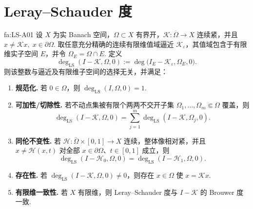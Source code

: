\section{Leray--Schauder 度}\label{sec:iii04-ls-degree}

\begin{FATheorem}{fa:LS-A01}
设 \(\displaystyle X\) 为实 Banach 空间，\(\displaystyle\Omega\subset X\) 有界开，\(\displaystyle\mathcal K:\overline\Omega\to X\) 连续紧，并且
\(\displaystyle x\neq\mathcal Kx, \; x\in\partial\Omega.\)
取任意充分精确的连续有限维值域逼近 \(\displaystyle\mathcal K_{\varepsilon}\)，其值域包含于有限维实子空间 \(\displaystyle E\)，并令 \(\displaystyle\Omega_E=\Omega\cap E\). 定义
\[
\deg_{\mathrm{LS}}(I-\mathcal K,\Omega,0)
:=
\deg\bigl(I_E-\mathcal K_{\varepsilon},\Omega_E,0\bigr).
\]
则该整数与逼近及有限维子空间的选择无关，并满足：

\begin{enumerate}
\item \textbf{规范化.} 若 \(\displaystyle0\in\Omega\)，则 \(\displaystyle\deg_{\mathrm{LS}}(I,\Omega,0)=1\).
\item \textbf{可加性/切除性.} 若不动点集被有限个两两不交开子集 \(\displaystyle\Omega_1,\dots,\Omega_m\Subset\Omega\) 覆盖，则
\[
\deg_{\mathrm{LS}}(I-\mathcal K,\Omega,0)
=
\sum_{j=1}^m
\deg_{\mathrm{LS}}(I-\mathcal K,\Omega_j,0).
\]
\item \textbf{同伦不变性.} 若 \(\displaystyle\mathcal H:\overline\Omega\times[0,1]\to X\) 连续，整体像相对紧，并且 \(\displaystyle x\neq\mathcal H(x,t)\) 对全部 \(\displaystyle x\in\partial\Omega\)、\(\displaystyle t\in[0,1]\) 成立，则
\[
\deg_{\mathrm{LS}}(I-\mathcal H_0,\Omega,0)
=
\deg_{\mathrm{LS}}(I-\mathcal H_1,\Omega,0).
\]
\item \textbf{存在性.} 若 \(\displaystyle\deg_{\mathrm{LS}}(I-\mathcal K,\Omega,0)\neq0\)，则存在 \(\displaystyle x\in\Omega\) 使 \(\displaystyle x=\mathcal Kx\).
\item \textbf{有限维一致性.} 若 \(\displaystyle X\) 有限维，则 Leray--Schauder 度与 \(\displaystyle I-\mathcal K\) 的 Brouwer 度一致.
\end{enumerate}
\end{FATheorem}

